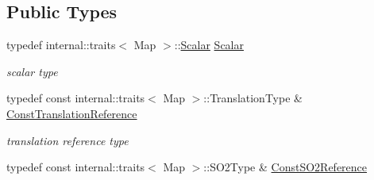 \subsection*{Public Types}
\begin{DoxyCompactItemize}
\item 
typedef internal\+::traits$<$ Map $>$\+::\hyperlink{class_eigen_1_1_map_3_01const_01_sophus_1_1_s_e2_group_3_01___scalar_01_4_00_01___options_01_4_a650e0e4b02a9d2374857c53ff39f5649}{Scalar} \hyperlink{class_eigen_1_1_map_3_01const_01_sophus_1_1_s_e2_group_3_01___scalar_01_4_00_01___options_01_4_a650e0e4b02a9d2374857c53ff39f5649}{Scalar}\hypertarget{class_eigen_1_1_map_3_01const_01_sophus_1_1_s_e2_group_3_01___scalar_01_4_00_01___options_01_4_a650e0e4b02a9d2374857c53ff39f5649}{}\label{class_eigen_1_1_map_3_01const_01_sophus_1_1_s_e2_group_3_01___scalar_01_4_00_01___options_01_4_a650e0e4b02a9d2374857c53ff39f5649}

\begin{DoxyCompactList}\small\item\em scalar type \end{DoxyCompactList}\item 
typedef const internal\+::traits$<$ Map $>$\+::Translation\+Type \& \hyperlink{class_eigen_1_1_map_3_01const_01_sophus_1_1_s_e2_group_3_01___scalar_01_4_00_01___options_01_4_a1f66099d992183637c4ac5bb1792f02d}{Const\+Translation\+Reference}\hypertarget{class_eigen_1_1_map_3_01const_01_sophus_1_1_s_e2_group_3_01___scalar_01_4_00_01___options_01_4_a1f66099d992183637c4ac5bb1792f02d}{}\label{class_eigen_1_1_map_3_01const_01_sophus_1_1_s_e2_group_3_01___scalar_01_4_00_01___options_01_4_a1f66099d992183637c4ac5bb1792f02d}

\begin{DoxyCompactList}\small\item\em translation reference type \end{DoxyCompactList}\item 
typedef const internal\+::traits$<$ Map $>$\+::S\+O2\+Type \& \hyperlink{class_eigen_1_1_map_3_01const_01_sophus_1_1_s_e2_group_3_01___scalar_01_4_00_01___options_01_4_a82e98c7b87974f4673520af28fd36576}{Const\+S\+O2\+Reference}\hypertarget{class_eigen_1_1_map_3_01const_01_sophus_1_1_s_e2_group_3_01___scalar_01_4_00_01___options_01_4_a82e98c7b87974f4673520af28fd36576}{}\label{class_eigen_1_1_map_3_01const_01_sophus_1_1_s_e2_group_3_01___scalar_01_4_00_01___options_01_4_a82e98c7b87974f4673520af28fd36576}


\end{DoxyCompactItemize}
